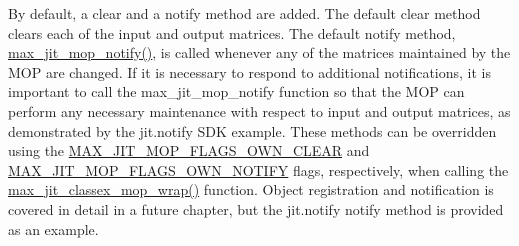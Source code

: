 By default, a clear and a notify method are added. The default clear method clears each of the input and output matrices. The default notify method, \hyperlink{group__maxmopmod_ga5032d682c77bcb7e2dcdf0e77d863d3c}{max\_\-jit\_\-mop\_\-notify()}, is called whenever any of the matrices maintained by the MOP are changed. If it is necessary to respond to additional notifications, it is important to call the max\_\-jit\_\-mop\_\-notify function so that the MOP can perform any necessary maintenance with respect to input and output matrices, as demonstrated by the jit.notify SDK example. These methods can be overridden using the \hyperlink{group__jitter_gaadd7ebf9b850b06496bdeb9414d181e4}{MAX\_\-JIT\_\-MOP\_\-FLAGS\_\-OWN\_\-CLEAR} and \hyperlink{group__jitter_ga669c2f28bba1dfb4181ebae8f19488bc}{MAX\_\-JIT\_\-MOP\_\-FLAGS\_\-OWN\_\-NOTIFY} flags, respectively, when calling the \hyperlink{group__maxmopmod_ga7e08584771f58ce1fe0b190d27b5759b}{max\_\-jit\_\-classex\_\-mop\_\-wrap()} function. Object registration and notification is covered in detail in a future chapter, but the jit.notify notify method is provided as an example.


